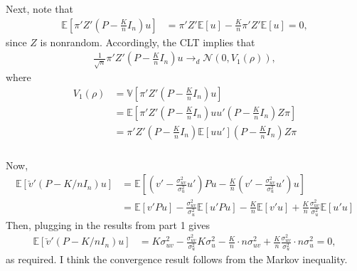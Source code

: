 \documentclass[12pt]{article}
\newcommand{\E}{\mathbb{E}}
\newcommand{\V}{\mathbb{V}}
\newcommand{\mtx}[1]{\ensuremath{\bm{\mathit{#1}}}}
\newcommand{\N}{\mathcal{N}}
\begin{document}
\subsubsection{}
Next, note that
\begin{align*}
\E[\mtx{\pi}'\mtx{Z}'(\mtx{P} - \frac{K}{n}\mtx{I}_n)\mtx{u}] &= \mtx{\pi}'\mtx{Z}'\E[\mtx{u}] - \frac{K}{n}\mtx{\pi}'\mtx{Z}'\E[\mtx{u}] = 0,
\end{align*}
since $\mtx{Z}$ is nonrandom. Accordingly, the CLT implies that
\begin{align*}
\frac{1}{\sqrt{n}} \mtx{\pi}'\mtx{Z}'(\mtx{P} - \frac{K}{n}\mtx{I}_n)\mtx{u} \to_d \N(0, V_1(\rho)),
\end{align*}
where
\begin{align*}
V_1(\rho) &= \V[\mtx{\pi}'\mtx{Z}'(\mtx{P} - \frac{K}{n}\mtx{I}_n)\mtx{u}]\\
&=\E[\mtx{\pi}'\mtx{Z}'(\mtx{P} - \frac{K}{n}\mtx{I}_n)\mtx{u}\mtx{u}' (\mtx{P} - \frac{K}{n}\mtx{I}_n)\mtx{Z}\mtx{\pi}]\\
&=\mtx{\pi}'\mtx{Z}'(\mtx{P} - \frac{K}{n}\mtx{I}_n) \E[\mtx{u}\mtx{u}' ](\mtx{P} - \frac{K}{n}\mtx{I}_n)\mtx{Z}\mtx{\pi}
\end{align*}

\subsubsection{}
Now,
\begin{align*}
\E[ \check{\mtx{v}}'(\mtx{P} -K/n\mtx{I}_n) \mtx{u}] &= \E\left[\left({\mtx{v}}' - \frac{\sigma^2_{uv}}{\sigma^2_u}\mtx{u}'\right)\mtx{P}\mtx{u} - \frac{K}{n} \left({\mtx{v}}' - \frac{\sigma^2_{uv}}{\sigma^2_u}\mtx{u}'\right)\mtx{u}\right]\\
&=\E[{\mtx{v}}'\mtx{P}\mtx{u}] - \frac{\sigma^2_{uv}}{\sigma^2_u}\E[\mtx{u}'\mtx{P}\mtx{u}] - \frac{K}{n}\E[\mtx{v}'\mtx{u}] + \frac{K}{n}\frac{\sigma^2_{uv}}{\sigma^2_u}\E[\mtx{u}'\mtx{u}]
\end{align*}
Then, plugging in the results from part 1 gives
\begin{align*}
\E[ \check{\mtx{v}}'(\mtx{P} -K/n\mtx{I}_n) \mtx{u}] &= K\sigma^2_{uv} - \frac{\sigma^2_{uv}}{\sigma^2_u} K \sigma^2_u - \frac{K}{n} \cdot n \sigma^2_{uv} + \frac{K}{n}\frac{\sigma^2_{uv}}{\sigma^2_u} \cdot n \sigma^2_u = 0,
\end{align*}
as required. I think the convergence result follows from the Markov inequality.

\iffalse
Now, to show the convergence result note that
\begin{align*}
 \check{\mtx{v}}'(\mtx{P} -K/n\mtx{I}_n) \mtx{u} &= {\mtx{v}}'\mtx{P}\mtx{u} -  \frac{\sigma^2_{uv}}{\sigma^2_u}\mtx{u}'\mtx{P}\mtx{u} - \frac{K}{n}\mtx{v}'\mtx{u} + \frac{K}{n}\frac{\sigma^2_{uv}}{\sigma^2_u}\mtx{u}'\mtx{u}
\end{align*}
Thus
\begin{align*}
\frac{1}{\sqrt{K}} \check{\mtx{v}}'(\mtx{P} -K/n\mtx{I}_n) \mtx{u} =  {\mtx{v}}'\mtx{P}\mtx{u} -  \frac{\sigma^2_{uv}}{\sigma^2_u}\mtx{u}'\mtx{P}\mtx{u} - \frac{K}{n}\mtx{v}'\mtx{u} + \frac{K}{n}\frac{\sigma^2_{uv}}{\sigma^2_u}\mtx{u}'\mtx{u}
\end{align*}
\fi
\end{document}
